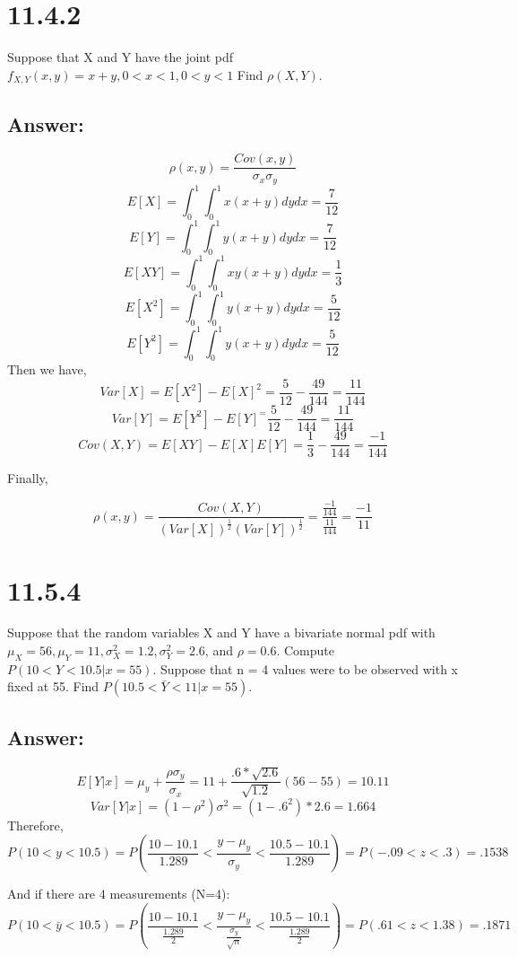 \documentclass[svgnames]{article}
\begin{document}
\section{11.4.2}
Suppose that X and Y have the joint pdf $f_{X,Y}(x, y) = x + y, 0 < x < 1, 0 < y < 1$
Find $\rho(X,Y)$. 

\subsection*{Answer:}
$$\rho(x,y)=\frac{Cov(x,y)}{\sigma_x\sigma_y}$$
$$E[X]=\int_{0}^{1}\int_{0}^{1}x(x+y)dydx=\frac{7}{12}$$
$$E[Y]=\int_{0}^{1}\int_{0}^{1}y(x+y)dydx=\frac{7}{12}$$
$$E[XY]=\int_{0}^{1}\int_{0}^{1}xy(x+y)dydx=\frac{1}{3}$$
$$E[X^2]=\int_{0}^{1}\int_{0}^{1}y(x+y)dydx=\frac{5}{12}$$
$$E[Y^2]=\int_{0}^{1}\int_{0}^{1}y(x+y)dydx=\frac{5}{12}$$
Then we have,
$$Var[X]=E[X^2]-E[X]^2=\frac{5}{12}-\frac{49}{144}=\frac{11}{144}$$
$$Var[Y]=E[Y^2]-E[Y]^=\frac{5}{12}-\frac{49}{144}=\frac{11}{144}$$
$$Cov(X,Y)=E[XY]-E[X]E[Y]=\frac{1}{3}-\frac{49}{144}=\frac{-1}{144}$$

Finally,

$$\rho(x,y)=\frac{Cov(X,Y)}{(Var[X])^{\frac{1}{2}}(Var[Y])^{\frac{1}{2}}}=\frac{\frac{-1}{144}}{\frac{11}{144}}=\frac{-1}{11}$$

\section{11.5.4}
Suppose that the random variables X and Y have a bivariate normal pdf with $\mu_{X} = 56, \mu_{Y} = 11, \sigma^2_{X} = 1.2, \sigma^2_{Y} =2.6$, and $\rho = 0.6$. Compute $P(10 <Y<10.5 | x = 55)$. Suppose that n = 4 values were to be observed with x fixed at 55. Find $P(10.5 < \bar{Y} < 11 | x = 55)$. 
\subsection*{Answer:}

$$E[Y|x]=\mu_y +\frac{\rho \sigma_{y}}{\sigma_{x}}=11+\frac{.6*\sqrt{2.6}}{\sqrt{1.2}}(56-55)=10.11$$
$$Var[Y|x]=(1-\rho^2)\sigma^2=(1-.6^2)*2.6=1.664$$
Therefore,
$$P(10<y<10.5)=P(\frac{10-10.1}{1.289}<\frac{y-\mu_y}{\sigma_y}<\frac{10.5-10.1}{1.289})=P(-.09<z<.3)=.1538$$

And if there are 4 measurements (N=4):
$$P(10<\bar{y}<10.5)=P(\frac{10-10.1}{\frac{1.289}{2}}<\frac{y-\mu_y}{\frac{\sigma_y}{\sqrt{n}}}<\frac{10.5-10.1}{\frac{1.289}{2}})=P(.61<z<1.38)=.1871$$
\end{document}
